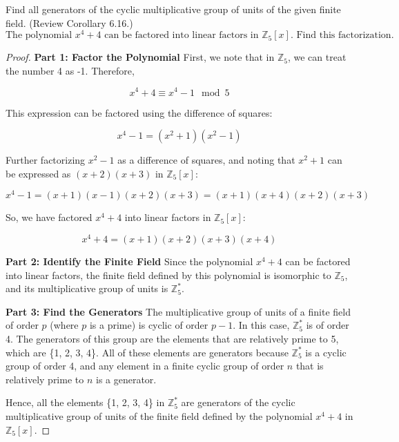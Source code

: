 \documentclass[12pt]{amsart}
\theoremstyle{definition}
\numberwithin{equation}{section}
\theoremstyle{plain}
\newcommand{\Z}{\mathbb{Z}}
\begin{document}
\vspace*{20pt}
\begin{exercise}{9}
Find all generators of the cyclic multiplicative group of units of the given finite field. (Review Corollary 6.16.)
\[\text{The polynomial }x^4 + 4\text{ can be factored into linear factors in }\Z_5[x] \text{. Find this factorization.}\]

\begin{proof}

\textbf{Part 1: Factor the Polynomial}
First, we note that in \(\Z_5\), we can treat the number 4 as -1. Therefore,

\[ x^4 + 4 \equiv x^4 - 1 \mod 5 \]

This expression can be factored using the difference of squares:

\[ x^4 - 1 = (x^2 + 1)(x^2 - 1) \]

Further factorizing \( x^2 - 1 \) as a difference of squares, and noting that \( x^2 + 1 \) can be expressed as \( (x + 2)(x + 3) \) in \(\Z_5[x]\):

\[ x^4 - 1 = (x + 1)(x - 1)(x + 2)(x + 3) = (x + 1)(x + 4)(x + 2)(x + 3) \]

So, we have factored \(x^4 + 4\) into linear factors in \(\Z_5[x]\):

\[ x^4 + 4 = (x + 1)(x + 2)(x + 3)(x + 4) \]

\textbf{Part 2: Identify the Finite Field}
Since the polynomial \(x^4 + 4\) can be factored into linear factors, the finite field defined by this polynomial is isomorphic to \(\Z_5\), and its multiplicative group of units is \(\Z_5^*\).

\textbf{Part 3: Find the Generators}
The multiplicative group of units of a finite field of order \( p \) (where \( p \) is a prime) is cyclic of order \( p - 1 \). In this case, \(\Z_5^*\) is of order 4. The generators of this group are the elements that are relatively prime to 5, which are \{1, 2, 3, 4\}. All of these elements are generators because \(\Z_5^*\) is a cyclic group of order 4, and any element in a finite cyclic group of order \( n \) that is relatively prime to \( n \) is a generator.

Hence, all the elements \{1, 2, 3, 4\} in \(\Z_5^*\) are generators of the cyclic multiplicative group of units of the finite field defined by the polynomial \(x^4 + 4\) in \(\Z_5[x]\).
\end{proof}
\end{exercise}
\vspace*{20pt}
\end{document}
